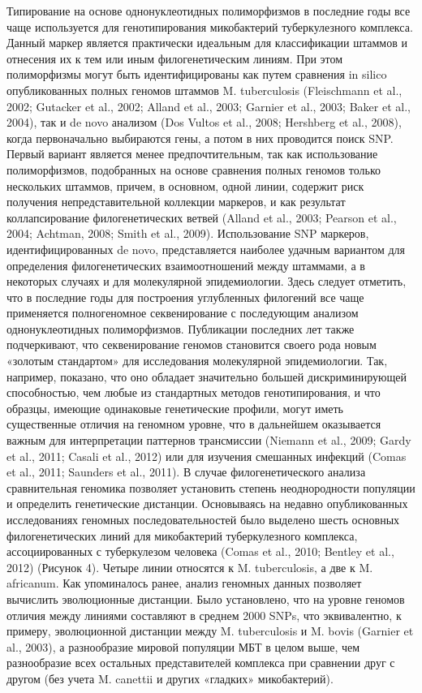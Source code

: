 Типирование на основе однонуклеотидных полиморфизмов в последние годы все чаще используется для генотипирования микобактерий туберкулезного комплекса. Данный маркер является практически идеальным для классификации штаммов и отнесения их к тем или иным филогенетическим линиям. При этом полиморфизмы могут быть идентифицированы как путем сравнения in silico опубликованных полных геномов штаммов M. tuberculosis (Fleischmann et al., 2002; Gutacker et al., 2002; Alland et al., 2003; Garnier et al., 2003; Baker et al., 2004), так и de novo анализом (Dos Vultos et al., 2008; Hershberg et al., 2008), когда первоначально выбираются гены, а потом в них проводится поиск SNP. Первый вариант является менее предпочтительным, так как использование полиморфизмов, подобранных на основе сравнения полных геномов только нескольких штаммов, причем, в основном, одной линии, содержит риск получения непредставительной коллекции маркеров, и как результат коллапсирование филогенетических ветвей (Alland et al., 2003; Pearson et al., 2004; Achtman, 2008; Smith et al., 2009). Использование SNP маркеров, идентифицированных de novo, представляется наиболее удачным вариантом для определения филогенетических взаимоотношений между штаммами, а в некоторых случаях и для молекулярной эпидемиологии. Здесь следует отметить, что в последние годы для построения углубленных филогений все чаще применяется полногеномное секвенирование с последующим анализом однонуклеотидных полиморфизмов. Публикации последних лет также подчеркивают, что секвенирование геномов становится своего рода новым «золотым стандартом» для исследования молекулярной эпидемиологии. Так, например, показано, что оно обладает значительно большей дискриминирующей способностью, чем любые из стандартных методов генотипирования, и что образцы, имеющие одинаковые генетические профили, могут иметь существенные отличия на геномном уровне, что в дальнейшем оказывается важным для интерпретации паттернов трансмиссии (Niemann et al., 2009; Gardy et al., 2011; Casali et al., 2012) или для изучения смешанных инфекций (Comas et al., 2011; Saunders et al., 2011). В случае филогенетического анализа сравнительная геномика позволяет установить степень неоднородности популяции и определить генетические дистанции. Основываясь на недавно опубликованных исследованиях геномных последовательностей было выделено шесть основных филогенетических линий для микобактерий туберкулезного комплекса, ассоциированных с туберкулезом человека (Comas et al., 2010; Bentley et al., 2012) (Рисунок 4). Четыре линии относятся к M. tuberculosis, а две к M. africanum. Как упоминалось ранее, анализ геномных данных позволяет вычислить эволюционные дистанции. Было установлено, что на уровне геномов отличия между линиями составляют в среднем 2000 SNPs, что эквивалентно, к примеру, эволюционной дистанции между M. tuberculosis и M. bovis (Garnier et al., 2003), а разнообразие мировой популяции МБТ в целом выше, чем разнообразие всех остальных представителей комплекса при сравнении друг с другом (без учета M. canettii и других «гладких» микобактерий).

